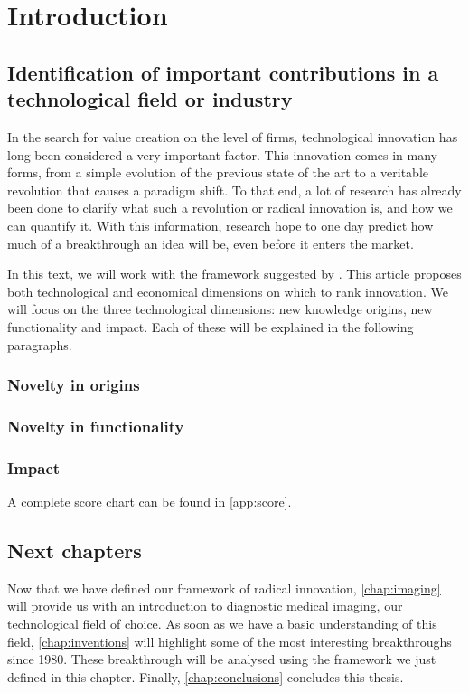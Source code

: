 \chapter{Introduction}
\section{Identification of important contributions in a technological field or industry}
In the search for value creation on the level of firms, technological innovation
has long been considered a very important factor. This innovation comes in many
forms, from a simple evolution of the previous state of the art to a
veritable revolution that causes a paradigm shift. To that end, a lot of
research has already been done to clarify what such a revolution or radical
innovation is, and how we can quantify it. \cite{structure, invention,
verhoeven} With this information, research hope to one day predict how much of
a breakthrough an idea will be, even before it enters the market.

In this text, we will work with the framework suggested by \cite{verhoeven}.
This article proposes both technological and economical dimensions on which to
rank innovation. We will focus on the three technological dimensions: new
knowledge origins, new functionality and impact. Each of these will be explained
in the following paragraphs.

\subsection{Novelty in origins}

\subsection{Novelty in functionality}

\subsection{Impact}

A complete score chart can be found in \autoref{app:score}.

\section{Next chapters}
Now that we have defined our framework of radical innovation,
\autoref{chap:imaging} will provide us with an introduction to diagnostic
medical imaging, our technological field of choice. As soon as we have a basic
understanding of this field, \autoref{chap:inventions} will highlight some of
the most interesting breakthroughs since 1980. These breakthrough will be
analysed using the framework we just defined in this chapter. Finally,
\autoref{chap:conclusions} concludes this thesis.

